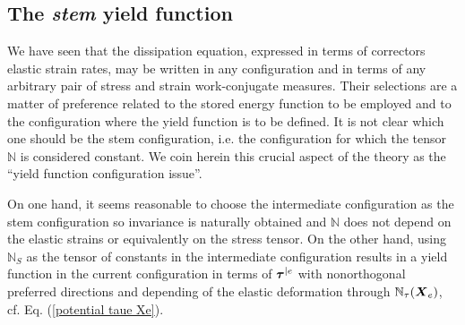 \documentclass[preprint,review,12pt,sort&compress]{elsarticle}%
\renewcommand{\mathbf}[1]{\mbox{\boldmath $#1$ \unboldmath}  \!\!}
\begin{document}
\subsection{The \emph{stem} yield function}

We have seen that the dissipation equation, expressed in terms of correctors
elastic strain rates, may be written in any configuration and in terms of any
arbitrary pair of stress and strain work-conjugate measures. Their selections
are a matter of preference related to the stored energy function to be
employed and to the configuration where the yield function is to be defined.
It is not clear which one should be the stem configuration, i.e. the
configuration for which the tensor $\mathbb{N}$ is considered constant. We
coin herein this crucial aspect of the theory as the \textquotedblleft yield
function configuration issue\textquotedblright.

On one hand, it seems reasonable to choose the intermediate configuration as
the stem configuration so invariance is naturally obtained and $\mathbb{N}$
does not depend on the elastic strains or equivalently on the stress tensor.
On the other hand, using $\mathbb{N}_{S}$ as the tensor of constants in the
intermediate configuration results in a yield function in the current
configuration in terms of $\mathbf{\tau}^{|e}$ with nonorthogonal preferred
directions and depending of the elastic deformation through $\mathbb{N}_{\tau
}(\mathbf{X}_{e})$, cf. Eq. (\ref{potential taue Xe}).
\end{document}
